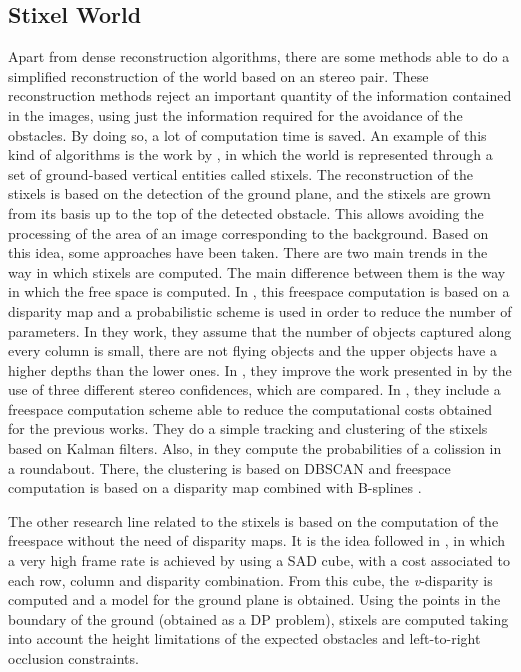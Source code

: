 \subsection{Stixel World}\label{ch:chapter00_02_04}

Apart from dense reconstruction algorithms, there are some methods able to do a simplified reconstruction of the world based on an stereo pair. These reconstruction methods reject an important quantity of the information contained in the images, using just the information required for the avoidance of the obstacles. By doing so, a lot of computation time is saved. An example of this kind of algorithms is the work by \cite{badino2009stixel}, in which the world is represented through a set of ground-based vertical entities called stixels. The reconstruction of the stixels is based on the detection of the ground plane, and the stixels are grown from its basis up to the top of the detected obstacle. This allows avoiding the processing of the area of an image corresponding to the background. 
Based on this idea, some approaches have been taken. There are two main trends in the way in which stixels are computed. The main difference between them is the way in which the free space is computed. In \cite{pfeiffer2011towards, pfeiffer2013exploiting, pfeiffer2010efficient, muffert2012may}, this freespace computation is based on a disparity map and a probabilistic scheme is used in order to reduce the number of parameters. In they work, they assume that the number of objects captured along every column is small, there are not flying objects and the upper objects have a higher depths than the lower ones. In \cite{pfeiffer2013exploiting}, they improve the work presented in \cite{pfeiffer2011towards} by the use of three different stereo confidences, which are compared. In \cite{pfeiffer2010efficient}, they include a freespace computation scheme able to reduce the computational costs obtained for the previous works. They do a simple tracking and clustering of the stixels based on Kalman filters. Also, in \cite{muffert2012may} they compute the probabilities of a colission in a roundabout. There, the clustering is based on DBSCAN \citep{ester1996density} and freespace computation is based on a disparity map combined with B-splines \citep{wedel2009bspline}. 

The other research line related to the stixels is based on the computation of the freespace without the need of disparity maps. It is the idea followed in \cite{benenson2011stixels, benenson2012pedestrian, benenson2012fast, gunyel2012stixels}, in which a very high frame rate is achieved by using a \ac{SAD} cube, with a cost associated to each row, column and disparity combination. From this cube, the \emph{v}-disparity is computed and a model for the ground plane is obtained. Using the points in the boundary of the ground (obtained as a \ac{DP} problem), stixels are computed taking into account the height limitations of the expected obstacles and left-to-right occlusion constraints. 

